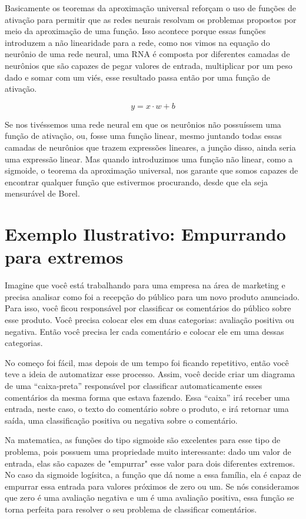 Basicamente os teoremas da aproximação universal reforçam o uso de funções de ativação para permitir que as redes neurais resolvam os problemas propostos por meio da aproximação de uma função. Isso acontece porque essas funções introduzem a não linearidade para a rede, como nos vimos na equação do neurônio de uma rede neural, uma RNA é composta por diferentes camadas de neurônios que são capazes de pegar valores de entrada, multiplicar por um peso dado e somar com um viés, esse resultado passa então por uma função de ativação.

\[ y = x \cdot w + b\]

Se nos tivéssemos uma rede neural em que os neurônios não possuíssem uma função de ativação, ou, fosse uma função linear, mesmo juntando todas essas camadas de neurônios que trazem expressões lineares, a junção disso, ainda seria uma expressão linear. Mas quando introduzimos uma função não linear, como a sigmoide, o teorema da aproximação universal, nos garante que somos capazes de encontrar qualquer função que estivermos procurando, desde que ela seja mensurável de Borel.

\section{Exemplo Ilustrativo: Empurrando para extremos}

Imagine que você está trabalhando para uma empresa na área de marketing e precisa analisar como foi a recepção do público para um novo produto anunciado. Para isso, você ficou responsável por classificar os comentários do público sobre esse produto. Você precisa colocar eles em duas categorias: avaliação positiva ou negativa. Então você precisa ler cada comentário e colocar ele em uma dessas categorias. 

No começo foi fácil, mas depois de um tempo foi ficando repetitivo, então você teve a ideia de automatizar esse processo. Assim, você decide criar um diagrama de uma “caixa-preta” responsável por classificar automaticamente esses comentários da mesma forma que estava fazendo. Essa “caixa” irá receber uma entrada, neste caso, o texto do comentário sobre o produto, e irá retornar uma saída, uma classificação positiva ou negativa sobre o comentário. 

Na matematica, as funções do tipo sigmoide são excelentes para esse tipo de problema, pois possuem uma propriedade muito interessante: dado um valor de entrada, elas são capazes de "empurrar" esse valor para dois diferentes extremos. No caso da sigmoide logísitca, a função que dá nome a essa família, ela é capaz de empurrar essa entrada para valores próximos de zero ou um. Se nós consideramos que zero é uma avaliação negativa e um é uma avaliação positiva, essa função se torna perfeita para resolver o seu problema de classificar comentários.


